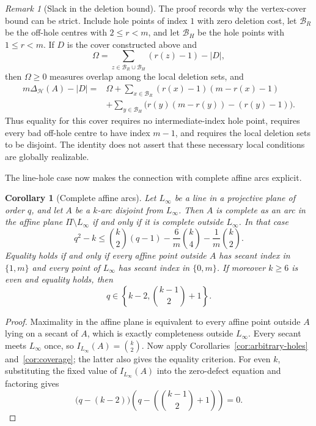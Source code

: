 \documentclass[11pt]{article}
\newtheorem{corollary}[theorem]{Corollary}
\theoremstyle{definition}
\theoremstyle{remark}
\newtheorem{remark}[theorem]{Remark}
\newcommand{\cH}{\mathcal{H}}
\begin{document}
\begin{remark}[Slack in the deletion bound]
\label{rem:deletion-slack}
The proof records why the vertex-cover bound can be strict.  Include
hole points of index \(1\) with zero deletion cost, let
\(\mathcal B_R\) be the off-hole centres with \(2\le r<m\), and let
\(\mathcal B_H\) be the hole points with \(1\le r<m\).  If \(D\) is the
cover constructed above and
\[
 \Omega=\sum_{z\in\mathcal B_R\cup\mathcal B_H}(r(z)-1)-|D|,
\]
then \(\Omega\ge0\) measures overlap among the local deletion sets, and
\[
\begin{split}
 m\Delta_{\cH}(A)-|D|
  ={}&\Omega+
  \sum_{x\in\mathcal B_R}(r(x)-1)(m-r(x)-1)\\
  &+\sum_{y\in\mathcal B_H}
       \bigl(r(y)(m-r(y))-(r(y)-1)\bigr).
\end{split}
\]
Thus equality for this cover requires no intermediate-index hole point,
requires every bad off-hole centre to have index \(m-1\), and requires
the local deletion sets to be disjoint.  The identity does not assert
that these necessary local conditions are globally realizable.
\end{remark}

The line-hole case now makes the connection with complete affine arcs
explicit.

\begin{corollary}[Complete affine arcs]
\label{cor:affine}
Let $L_\infty$ be a line in a projective plane of order $q$, and let $A$ be
a $k$-arc disjoint from $L_\infty$.  Then $A$ is complete as an arc in the
affine plane $\Pi\setminus L_\infty$ if and only if it is complete outside
$L_\infty$.  In that case
\begin{equation}
 q^2-k\le
 \binom{k}{2}(q-1)-\frac6m\binom{k}{4}
 -\frac1m\binom{k}{2}.
\label{eq:affine-complete}
\end{equation}
Equality holds if and only if every affine point outside $A$ has secant index
in $\{1,m\}$ and every point of $L_\infty$ has secant index in $\{0,m\}$.
If moreover $k\ge6$ is even and equality holds, then
\[
 q\in\left\{k-2,\binom{k-1}{2}+1\right\}.
\]
\end{corollary}

\begin{proof}
Maximality in the affine plane is equivalent to every affine point outside
$A$ lying on a secant of $A$, which is exactly completeness outside
$L_\infty$.  Every secant meets $L_\infty$ once, so
$I_{L_\infty}(A)=\binom{k}{2}$.  Now apply
Corollaries~\ref{cor:arbitrary-holes} and~\ref{cor:coverage}; the latter also
gives the equality criterion.  For even $k$, substituting the fixed value of
$I_{L_\infty}(A)$ into the zero-defect equation and factoring gives
\[
 \bigl(q-(k-2)\bigr)
 \left(q-\left(\binom{k-1}{2}+1\right)\right)=0.
\]
\end{proof}
\end{document}
